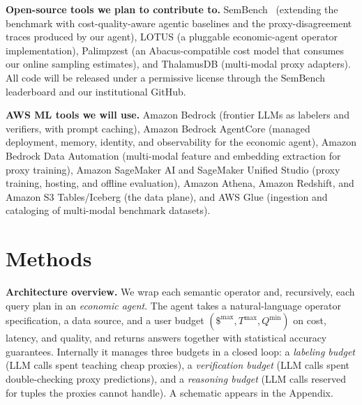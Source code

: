 \documentclass[11pt]{article}
\begin{document}
\noindent\textbf{Open-source tools we plan to contribute to.}
SemBench~\cite{lao2025sembench} (extending the benchmark with cost-quality-aware agentic baselines and the proxy-disagreement traces produced by our agent), LOTUS (a pluggable economic-agent operator implementation), Palimpzest (an Abacus-compatible cost model that consumes our online sampling estimates), and ThalamusDB (multi-modal proxy adapters). All code will be released under a permissive license through the SemBench leaderboard and our institutional GitHub.

\noindent\textbf{AWS ML tools we will use.}
Amazon Bedrock (frontier LLMs as labelers and verifiers, with prompt caching), Amazon Bedrock AgentCore (managed deployment, memory, identity, and observability for the economic agent), Amazon Bedrock Data Automation (multi-modal feature and embedding extraction for proxy training), Amazon SageMaker AI and SageMaker Unified Studio (proxy training, hosting, and offline evaluation), Amazon Athena, Amazon Redshift, and Amazon S3 Tables/Iceberg (the data plane), and AWS Glue (ingestion and cataloging of multi-modal benchmark datasets).

\section{Methods}

\noindent\textbf{Architecture overview.}
We wrap each semantic operator and, recursively, each query plan in an \emph{economic agent}. The agent takes a natural-language operator specification, a data source, and a user budget $(\$^{\max}, T^{\max}, Q^{\min})$ on cost, latency, and quality, and returns answers together with statistical accuracy guarantees. Internally it manages three budgets in a closed loop: a \emph{labeling budget} (LLM calls spent teaching cheap proxies), a \emph{verification budget} (LLM calls spent double-checking proxy predictions), and a \emph{reasoning budget} (LLM calls reserved for tuples the proxies cannot handle). A schematic appears in the Appendix.
\end{document}

